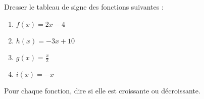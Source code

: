 
\begin{exercice}\label{exosmath-0001}

    Dresser le tableau de signe des fonctions suivantes :
    \begin{multicols}{3}
        \begin{enumerate}
            \item
                \( f(x)=2x-4\)
            \item
                \( h(x)=-3x+10\)
            \item
                \( g(x)=\frac{ x }{2}\)
            \item
                \( i(x)=-x\)
        \end{enumerate}
    \end{multicols}
    Pour chaque fonction, dire si elle est croissante ou décroissante.

\end{exercice}

